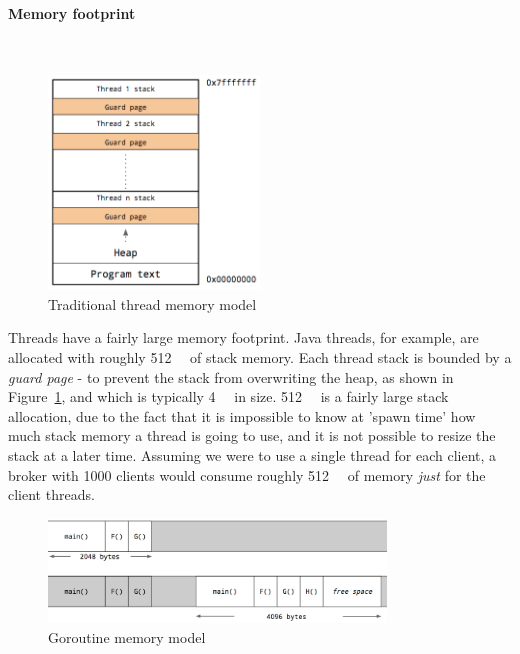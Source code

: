 \paragraph{Memory footprint} \mbox{}\\

\begin{figure}[H]
  \centering
  \includegraphics[width=0.5\textwidth]{figures/threads}
  \caption{Traditional thread memory model \cite{performanceWithoutTheEventLoop}}
  \label{fig:threadMemoryModel}
\end{figure}

Threads have a fairly large memory footprint. Java threads, for example, are
allocated with roughly \SI{512}{\kibi\byte} of stack memory. Each thread stack
is bounded by a \emph{guard page} - to prevent the stack from overwriting the
heap, as shown in Figure~\ref{fig:threadMemoryModel}, and which is typically
\SI{4}{\kibi\byte} in size. \SI{512}{\kibi\byte} is a fairly large stack
allocation, due to the fact that it is impossible to know at 'spawn time' how
much stack memory a thread is going to use, and it is not possible to resize the
stack at a later time. Assuming we were to use a single thread for each client,
a broker with 1000 clients would consume roughly \SI{512}{\mebi\byte} of memory
\emph{just} for the client threads.

\begin{figure}[H]
  \centering
  \includegraphics[width=0.8\textwidth]{figures/stack-growth}
  \caption{Goroutine memory model \cite{performanceWithoutTheEventLoop}}
  \label{fig:goMemoryModel}
\end{figure}


